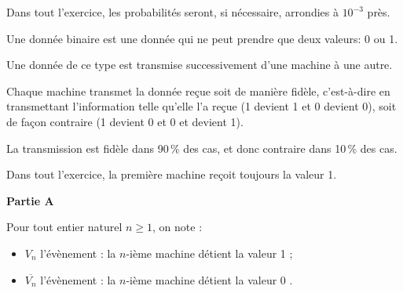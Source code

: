 \medskip

Dans tout l'exercice, les probabilités seront, si nécessaire, arrondies à $10^{-3}$ près.

Une donnée binaire est une donnée qui ne peut prendre que deux valeurs:  0 ou 1.

Une donnée de ce type est transmise successivement d'une machine à une autre.

Chaque machine transmet la donnée reçue soit de manière fidèle, c'est-à-dire en
transmettant l'information telle qu'elle l'a reçue (1 devient 1 et 0 devient 0), soit de façon
contraire (1 devient 0 et 0 et devient 1).

La transmission est fidèle dans 90\,\% des cas, et donc contraire dans 10\,\% des cas.

Dans tout l'exercice, la première machine reçoit toujours la valeur 1.

\medskip

\textbf{Partie A}

\medskip

Pour tout entier naturel $n \geqslant 1$, on note :

\begin{itemize}[label=$\bullet~$]
\item $V_n$ l'évènement : \og la $n$-ième machine détient la valeur 1 \fg{};
\item $\overline{V_n}$ l'évènement : \og la $n$-ième machine détient la valeur 0 \fg{}.
\end{itemize}

\medskip

